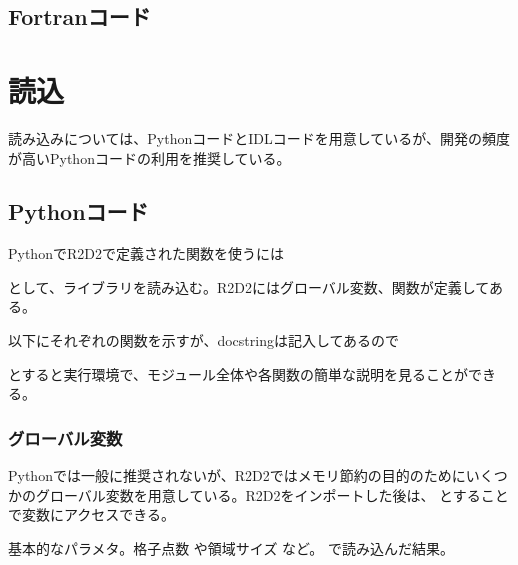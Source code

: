 \documentclass[letterpaper,10pt,dvipdfmx,report]{sphinxmanual}
\begin{document}
\subsection{Fortranコード}
\label{\detokenize{io:fortran}}

\section{読込}
\label{\detokenize{io:id3}}
読み込みについては、PythonコードとIDLコードを用意しているが、開発の頻度が高いPythonコードの利用を推奨している。


\subsection{Pythonコード}
\label{\detokenize{io:module-R2D2}}\label{\detokenize{io:python}}
PythonでR2D2で定義された関数を使うには

\begin{sphinxVerbatim}[commandchars=\\\{\}]
 
\end{sphinxVerbatim}

として、ライブラリを読み込む。R2D2にはグローバル変数、関数が定義してある。

以下にそれぞれの関数を示すが、docstringは記入してあるので

\begin{sphinxVerbatim}[commandchars=\\\{\}]
\end{sphinxVerbatim}

とすると実行環境で、モジュール全体や各関数の簡単な説明を見ることができる。


\subsubsection{グローバル変数}
\label{\detokenize{io:id4}}
Pythonでは一般に推奨されないが、R2D2ではメモリ節約の目的のためにいくつかのグローバル変数を用意している。R2D2をインポートした後は、 とすることで変数にアクセスできる。

\begin{fulllineitems}
\label{\detokenize{io:R2D2.R2D2.p}}
基本的なパラメタ。格子点数  や領域サイズ  など。  で読み込んだ結果。

\end{fulllineitems}
\end{document}
